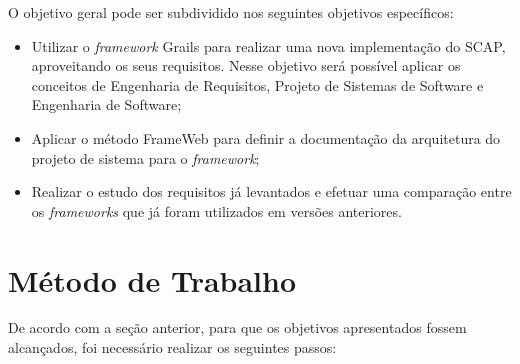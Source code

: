 O objetivo geral pode ser subdividido nos seguintes objetivos específicos:

\begin{itemize}

	\item Utilizar o \textit{framework} Grails para realizar uma nova implementação do SCAP, aproveitando os seus requisitos. Nesse objetivo será possível aplicar os conceitos de Engenharia de Requisitos, Projeto de Sistemas de Software e Engenharia de Software;
	\item Aplicar o método FrameWeb para definir a documentação da arquitetura do projeto de sistema para o \textit{framework};
    \item Realizar o estudo dos requisitos já levantados e efetuar uma comparação entre os \textit{frameworks} que já foram utilizados em versões anteriores.

\end{itemize}




\section{Método de Trabalho}
\label{sec-intro-metodo}

De acordo com a seção anterior, para que os objetivos apresentados fossem alcançados, foi necessário realizar os seguintes passos:

